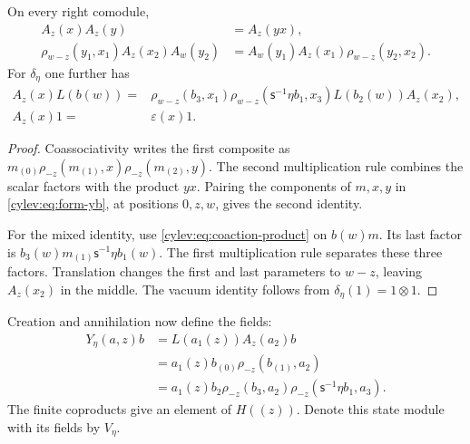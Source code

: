 \begin{lemma}\label{cylev:lem:operators}
On every right comodule,
\begin{align}
 A_z(x)A_z(y)&=A_z(yx),\label{cylev:eq:anti-action}\\
 \rho_{w-z}(y_1,x_1)A_z(x_2)A_w(y_2)
 &=A_w(y_1)A_z(x_1)\rho_{w-z}(y_2,x_2).
       \label{cylev:eq:annihilation-exchange}
\end{align}
For $\delta_\eta$ one further has
\begin{align}
 A_z(x)L(b(w))={}&\rho_{w-z}(b_3,x_1)
    \rho_{w-z}(\mathsf s^{-1}\eta b_1,x_3)
    L(b_2(w))A_z(x_2),\label{cylev:eq:mixed-operators}\\
 A_z(x)1={}&\varepsilon(x)1.\label{cylev:eq:annihilation-vacuum}
\end{align}
\end{lemma}
\begin{proof}
Coassociativity writes the first composite as
$m_{(0)}\rho_{-z}(m_{(1)},x)\rho_{-z}(m_{(2)},y)$.
The second multiplication rule combines the scalar factors with
the product $yx$. Pairing the components of $m,x,y$ in
\eqref{cylev:eq:form-yb}, at positions $0,z,w$, gives the second
identity.

For the mixed identity, use \eqref{cylev:eq:coaction-product} on
$b(w)m$. Its last factor is
$b_3(w)m_{(1)}\mathsf s^{-1}\eta b_1(w)$.
The first multiplication rule separates these three factors.
Translation changes the first and last parameters to $w-z$,
leaving $A_z(x_2)$ in the middle. The vacuum identity follows from
$\delta_\eta(1)=1\otimes1$.
\end{proof}

Creation and annihilation now define the fields:
\begin{equation}\label{cylev:eq:field}
\begin{split}
 Y_\eta(a,z)b
 &=L(a_1(z))A_z(a_2)b\\
 &=a_1(z)b_{(0)}\rho_{-z}(b_{(1)},a_2)\\
 &=a_1(z)b_2\rho_{-z}(b_3,a_2)
                  \rho_{-z}(\mathsf s^{-1}\eta b_1,a_3).
\end{split}
\end{equation}
The finite coproducts give an element of $H((z))$.
Denote this state module with its fields by $V_\eta$.

